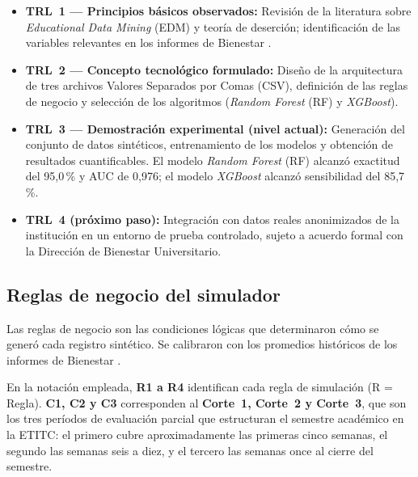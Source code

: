 \documentclass[12pt,letterpaper]{article}
\newcommand{\RF}{\textit{Random Forest} (RF)\xspace}
\newcommand{\XGB}{\textit{XGBoost}\xspace}
\newcommand{\CSV}{Valores Separados por Comas (CSV)\xspace}
\newcommand{\EDM}{\textit{Educational Data Mining} (EDM)\xspace}
\begin{document}
\begin{itemize}
  \item \textbf{TRL~1 — Principios básicos observados:} Revisión de la literatura sobre \EDM y teoría de deserción; identificación de las variables relevantes en los informes de Bienestar \parencite{tinto1975, macfadyen2010}.
  \item \textbf{TRL~2 — Concepto tecnológico formulado:} Diseño de la arquitectura de tres archivos \CSV, definición de las reglas de negocio y selección de los algoritmos (\RF y \XGB).
  \item \textbf{TRL~3 — Demostración experimental (nivel actual):} Generación del conjunto de datos sintéticos, entrenamiento de los modelos y obtención de resultados cuantificables. El modelo \RF alcanzó exactitud del 95,0\,\% y AUC de 0,976; el modelo \XGB alcanzó sensibilidad del 85,7\,\%.
  \item \textbf{TRL~4 (próximo paso):} Integración con datos reales anonimizados de la institución en un entorno de prueba controlado, sujeto a acuerdo formal con la Dirección de Bienestar Universitario.
\end{itemize}

\subsection{Reglas de negocio del simulador}

Las reglas de negocio son las condiciones lógicas que determinaron cómo se generó cada registro sintético. Se calibraron con los promedios históricos de los informes de Bienestar \parencite{etitc_bienestar}.

En la notación empleada, \textbf{R1 a R4} identifican cada regla de simulación (R = Regla). \textbf{C1, C2 y C3} corresponden al \textbf{Corte~1, Corte~2 y Corte~3}, que son los tres períodos de evaluación parcial que estructuran el semestre académico en la ETITC: el primero cubre aproximadamente las primeras cinco semanas, el segundo las semanas seis a diez, y el tercero las semanas once al cierre del semestre.
\end{document}
